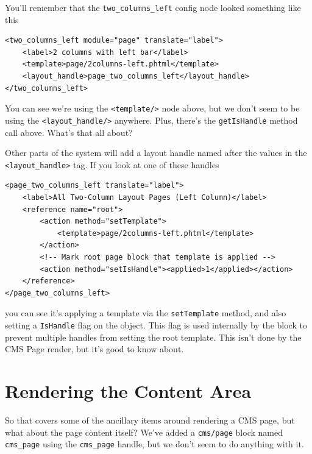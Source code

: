 \documentclass[oneside]{book}
\begin{document}
You'll remember that the \footnotesize\texttt{two\_columns\_left} \normalsize  config node looked something like this

\begin{lstlisting}
<two_columns_left module="page" translate="label">
    <label>2 columns with left bar</label>
    <template>page/2columns-left.phtml</template>
    <layout_handle>page_two_columns_left</layout_handle>
</two_columns_left>

\end{lstlisting}


You can see we're using the \footnotesize\texttt{\textless template/\textgreater } \normalsize  node above, but we don't seem to be using the \footnotesize\texttt{\textless layout\_handle/\textgreater } \normalsize  anywhere.  Plus, there's the \footnotesize\texttt{getIsHandle} \normalsize  method call above.  What's that all about?   

Other parts of the system will add a layout handle named after the values in the \footnotesize\texttt{\textless layout\_handle\textgreater } \normalsize  tag. If you look at one of these handles

\begin{lstlisting}
<page_two_columns_left translate="label">
    <label>All Two-Column Layout Pages (Left Column)</label>
    <reference name="root">
        <action method="setTemplate">
            <template>page/2columns-left.phtml</template>
        </action>
        <!-- Mark root page block that template is applied -->
        <action method="setIsHandle"><applied>1</applied></action>
    </reference>
</page_two_columns_left>

\end{lstlisting}


you can see it's applying a template via the \footnotesize\texttt{setTemplate} \normalsize  method, and also setting a \footnotesize\texttt{IsHandle} \normalsize  flag on the object.  This flag is used internally by the block to prevent multiple handles from setting the root template.  This isn't done by the CMS Page render, but it's good to know about. 

\section{Rendering the Content Area}

So that covers some of the ancillary items around rendering a CMS page, but what about the page content itself?  We've added a \footnotesize\texttt{cms/page} \normalsize  block named \footnotesize\texttt{cms\_page} \normalsize  using the \footnotesize\texttt{cms\_page} \normalsize  handle, but we don't seem to do anything with it.
\end{document}
